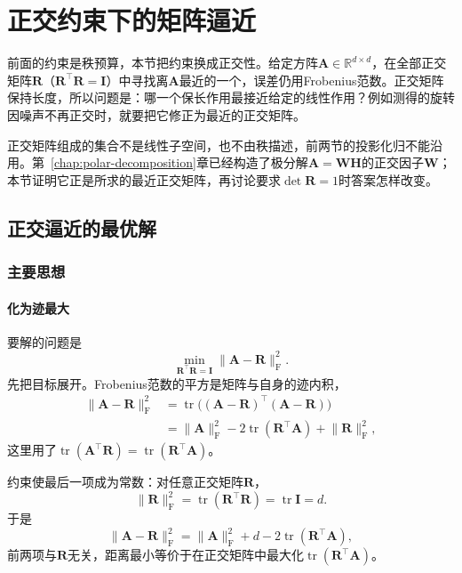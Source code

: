 
\section{正交约束下的矩阵逼近}
\label{sec:matrix-approximation-orthogonal}

前面的约束是秩预算，本节把约束换成正交性。给定方阵$\bm A\in\mathbb R^{d\times d}$，在全部正交矩阵$\bm R$（$\bm R^\top\bm R=\bm I$）中寻找离$\bm A$最近的一个，误差仍用Frobenius范数。正交矩阵保持长度，所以问题是：哪一个保长作用最接近给定的线性作用？例如测得的旋转因噪声不再正交时，就要把它修正为最近的正交矩阵。

正交矩阵组成的集合不是线性子空间，也不由秩描述，前两节的投影化归不能沿用。第~\ref{chap:polar-decomposition}章已经构造了极分解$\bm A=\bm W\bm H$的正交因子$\bm W$；本节证明它正是所求的最近正交矩阵，再讨论要求$\det\bm R=1$时答案怎样改变。

\subsection{正交逼近的最优解}
\label{sec:matrix-approximation-orthogonal-optimum}

\subsubsection{主要思想}

\paragraph{化为迹最大}
要解的问题是
\begin{equation}
 \min_{\bm R^\top\bm R=\bm I}\lVert\bm A-\bm R\rVert_{\mathrm F}^2 .
 \label{eq:matrix-approximation-orthogonal-problem}
\end{equation}
先把目标展开。Frobenius范数的平方是矩阵与自身的迹内积，
\[
 \begin{aligned}
 \lVert\bm A-\bm R\rVert_{\mathrm F}^2
 &=\operatorname{tr}\bigl((\bm A-\bm R)^\top(\bm A-\bm R)\bigr)\\
 &=\lVert\bm A\rVert_{\mathrm F}^2-2\operatorname{tr}(\bm R^\top\bm A)+\lVert\bm R\rVert_{\mathrm F}^2 ,
 \end{aligned}
\]
这里用了$\operatorname{tr}(\bm A^\top\bm R)=\operatorname{tr}(\bm R^\top\bm A)$。

约束使最后一项成为常数：对任意正交矩阵$\bm R$，
\[
 \lVert\bm R\rVert_{\mathrm F}^2=\operatorname{tr}(\bm R^\top\bm R)=\operatorname{tr}\bm I=d .
\]
于是
\begin{equation}
 \lVert\bm A-\bm R\rVert_{\mathrm F}^2
 =\lVert\bm A\rVert_{\mathrm F}^2+d-2\operatorname{tr}(\bm R^\top\bm A),
 \label{eq:matrix-approximation-orthogonal-expansion}
\end{equation}
前两项与$\bm R$无关，距离最小等价于在正交矩阵中最大化$\operatorname{tr}(\bm R^\top\bm A)$。

